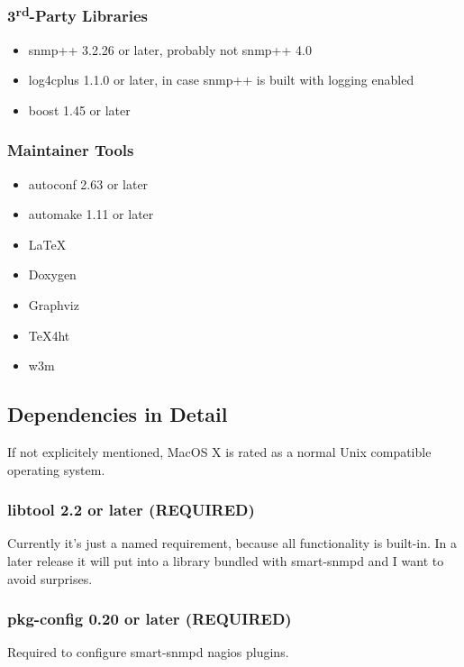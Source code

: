 \subsubsection{3\textsuperscript{rd}-Party Libraries}

\begin{itemize}
\item{snmp++ 3.2.26 or later, probably not snmp++ 4.0}
\item{log4cplus 1.1.0 or later, in case snmp++ is built with logging enabled}
\item{boost 1.45 or later}
\end{itemize}

\subsubsection{Maintainer Tools}

\begin{itemize}
\item{autoconf 2.63 or later}
\item{automake 1.11 or later}
\item{\LaTeX}
\item{Doxygen}
\item{Graphviz}
\item{{\TeX}4ht}
\item{w3m}
\end{itemize}

\subsection{Dependencies in Detail}

If not explicitely mentioned, MacOS X is rated as a normal Unix compatible
operating system.

\subsubsection{libtool 2.2 or later (REQUIRED)}

Currently it's just a named requirement, because all functionality is
built-in. In a later release it will put into a library bundled with
smart-snmpd and I want to avoid surprises.

\subsubsection{pkg-config 0.20 or later (REQUIRED)}

Required to configure smart-snmpd nagios plugins.

